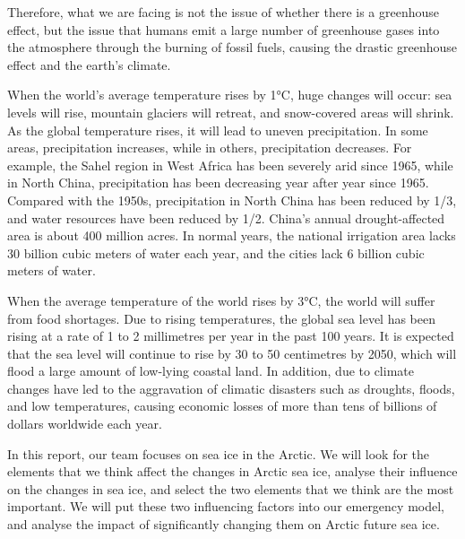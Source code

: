 Therefore, what we are facing is not the issue of whether there is a greenhouse effect, but the issue that humans emit a large number of greenhouse gases into the atmosphere through the burning of fossil fuels, causing the drastic greenhouse effect and the earth’s climate.

When the world's average temperature rises by 1°C, huge changes will occur: sea levels will rise, mountain glaciers will retreat, and snow-covered areas will shrink. As the global temperature rises, it will lead to uneven precipitation. In some areas, precipitation increases, while in others, precipitation decreases. For example, the Sahel region in West Africa has been severely arid since 1965, while in North China, precipitation has been decreasing year after year since 1965. Compared with the 1950s, precipitation in North China has been reduced by 1/3, and water resources have been reduced by 1/2. China's annual drought-affected area is about 400 million acres. In normal years, the national irrigation area lacks 30 billion cubic meters of water each year, and the cities lack 6 billion cubic meters of water. 

When the average temperature of the world rises by 3°C, the world will suffer from food shortages. Due to rising temperatures, the global sea level has been rising at a rate of 1 to 2 millimetres per year in the past 100 years. It is expected that the sea level will continue to rise by 30 to 50 centimetres by 2050, which will flood a large amount of low-lying coastal land. In addition, due to climate changes have led to the aggravation of climatic disasters such as droughts, floods, and low temperatures, causing economic losses of more than tens of billions of dollars worldwide each year.


In this report, our team focuses on sea ice in the Arctic. We will look for the elements that we think affect the changes in Arctic sea ice, analyse their influence on the changes in sea ice, and select the two elements that we think are the most important. We will put these two influencing factors into our emergency model, and analyse the impact of significantly changing them on Arctic future sea ice.